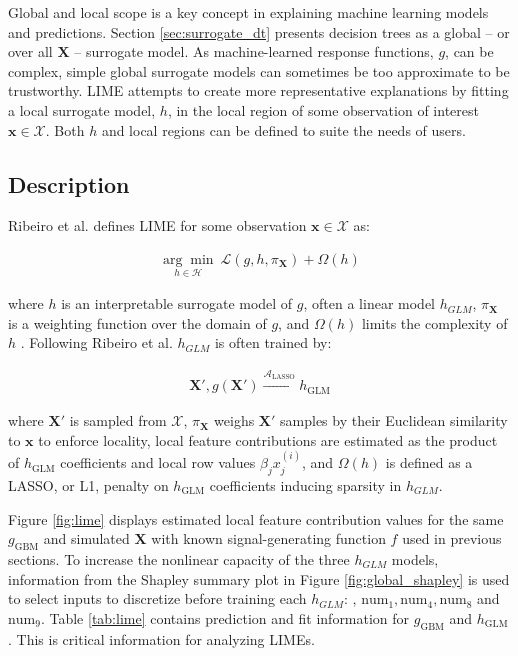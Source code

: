 \documentclass[11pt]{asaproc}
\begin{document}
Global and local scope is a key concept in explaining machine learning models and predictions. Section \ref{sec:surrogate_dt} presents decision trees as a global -- or over all $\mathbf{X}$ -- surrogate model. As machine-learned response functions, $g$, can be complex, simple global surrogate models can sometimes be too approximate to be trustworthy. LIME attempts to create more representative explanations by fitting a local surrogate model, $h$, in the local region of some observation of interest $\mathbf{x} \in \mathcal{X}$. Both $h$ and local regions can be defined to suite the needs of users.

\subsection{Description}

Ribeiro et al. defines LIME for some observation $\mathbf{x} \in \mathcal{X}$ as:

\begin{equation}
\begin{aligned}
\underset{h \in \mathcal{H}}{\arg\min}\:\mathcal{L}(g, h, \pi_{\mathbf{X}}) + \Omega(h)
\end{aligned}
\end{equation}

\noindent where $h$ is an interpretable surrogate model of $g$, often a linear model $h_{GLM}$, $\pi_{\mathbf{X}}$ is a weighting function over the domain of $g$, and $\Omega(h)$ limits the complexity of $h$ \cite{lime}. Following Ribeiro et al. $h_{GLM}$ is often trained by:

\begin{equation}
\begin{aligned}
\mathbf{X}', g(\mathbf{X}') \xrightarrow{\mathcal{A}_{\text{LASSO}}} h_{\text{GLM}}
\end{aligned}
\end{equation}

\noindent where $\mathbf{X}'$ is sampled from $\mathcal{X}$, $\pi_{\mathbf{X}}$ weighs $\mathbf{X}'$ samples by their Euclidean similarity to $\mathbf{x}$ to enforce locality, local feature contributions are estimated as the product of $h_{\text{GLM}}$ coefficients and local row values $\beta_j x^{(i)}_j$, and $\Omega(h)$ is defined as a LASSO, or L1, penalty on $h_{\text{GLM}}$ coefficients inducing sparsity in $h_{GLM}$. 		

Figure \ref{fig:lime} displays estimated local feature contribution values for the same $g_{\text{GBM}}$ and simulated $\mathbf{X}$ with known signal-generating function $f$ used in previous sections. To increase the nonlinear capacity of the three $h_{GLM}$ models, information from the Shapley summary plot in Figure \ref{fig:global_shapley} is used to select inputs to discretize before training each $h_{GLM}$: , $\text{num}_1, \text{num}_4, \text{num}_8$ and $\text{num}_9$. Table \ref{tab:lime} contains prediction and fit information for $g_{\text{GBM}}$ and $h_{\text{GLM}}$. This is critical information for analyzing LIMEs.
\end{document}

